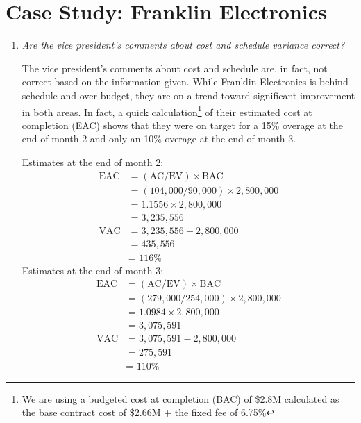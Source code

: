 \documentclass[letterpaper,10pt]{article}
\begin{document}
\section*{Case Study: Franklin Electronics}
\begin{enumerate}
\item \emph{Are the vice president's comments about cost and schedule variance correct?}
\par The vice president's comments about cost and schedule are, in fact, not correct based on the information given.  While Franklin Electronics is behind schedule and over budget, they are on a trend toward significant improvement in both areas.  In fact, a quick calculation\footnote{We are using a budgeted cost at completion (BAC) of \$2.8M calculated as the base contract cost of \$2.66M + the fixed fee of 6.75\%} of their estimated cost at completion (EAC) shows that they were on target for a 15\% overage at the end of month 2 and only an 10\% overage at the end of month 3.
\par Estimates at the end of month 2:
\begin{align*}
\mbox{EAC} &= (\mbox{AC}/\mbox{EV})\times \mbox{BAC} \\
&= (104,000 / 90,000)\times 2,800,000 \\
&= 1.1556\times 2,800,000 \\
&= 3,235,556 \\
\mbox{VAC} &= 3,235,556 - 2,800,000 \\
&= 435,556 \\
&= \mbox{\ 116\%}
\end{align*}
Estimates at the end of month 3:
\begin{align*}
\mbox{EAC} &= (\mbox{AC}/\mbox{EV})\times \mbox{BAC} \\
&= (279,000 / 254,000)\times 2,800,000 \\
&= 1.0984\times 2,800,000 \\
&= 3,075,591 \\
\mbox{VAC} &= 3,075,591 - 2,800,000 \\
&= 275,591 \\
&= \mbox{\ 110\%}
\end{align*}


\end{enumerate}
\end{document}
